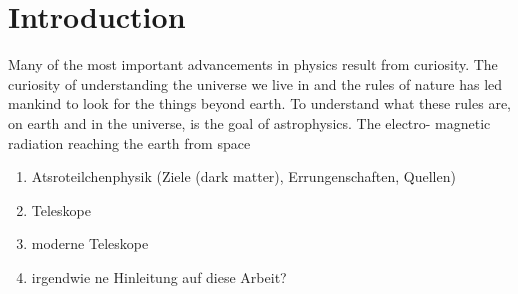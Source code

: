 \chapter{Introduction}
\nocite{biblatex, siunitx, scikit-learn, Hunter:2007}%

Many of the most important advancements in physics result from curiosity. The
curiosity of understanding the universe we live in and the rules of nature has
led mankind to look for the things beyond earth. To understand what these rules
are, on earth and in the universe, is the goal of astrophysics. The electro-
magnetic radiation reaching the earth from space

\begin{enumerate}
  \item Atsroteilchenphysik (Ziele (dark matter), Errungenschaften, Quellen)
  \item Teleskope
  \item moderne Teleskope
  \item irgendwie ne Hinleitung auf diese Arbeit?
\end{enumerate}
